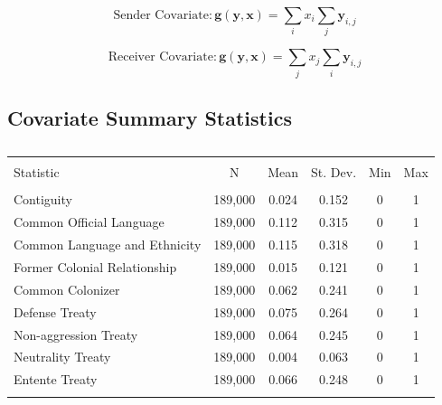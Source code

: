 \documentclass{article}
\begin{document}
$$ \text{Sender Covariate}: \bm{g(y,x)} = \sum_{i}x_i \sum_{j} \bm{y}_{i,j}$$

$$ \text{Receiver Covariate}: \bm{g(y,x)} = \sum_{j}x_j \sum_{i} \bm{y}_{i,j}$$

\subsection{Covariate Summary Statistics}

\begin{table}[!htbp] \centering 
  \caption{} 
  \label{} 
\begin{tabular}{@{\extracolsep{5pt}}lccccc} 
\\[-1.8ex]\hline 
\hline \\[-1.8ex] 
Statistic & \multicolumn{1}{c}{N} & \multicolumn{1}{c}{Mean} & \multicolumn{1}{c}{St. Dev.} & \multicolumn{1}{c}{Min} & \multicolumn{1}{c}{Max} \\ 
\hline \\[-1.8ex] 
Contiguity & 189,000 & 0.024 & 0.152 & 0 & 1 \\ 
Common Official Language & 189,000 & 0.112 & 0.315 & 0 & 1 \\ 
Common Language and Ethnicity & 189,000 & 0.115 & 0.318 & 0 & 1 \\ 
Former Colonial Relationship & 189,000 & 0.015 & 0.121 & 0 & 1 \\ 
Common Colonizer & 189,000 & 0.062 & 0.241 & 0 & 1 \\ 
Defense Treaty & 189,000 & 0.075 & 0.264 & 0 & 1 \\ 
Non-aggression Treaty & 189,000 & 0.064 & 0.245 & 0 & 1 \\ 
Neutrality Treaty & 189,000 & 0.004 & 0.063 & 0 & 1 \\ 
Entente Treaty & 189,000 & 0.066 & 0.248 & 0 & 1 \\ 
\hline \\[-1.8ex] 
\end{tabular} 
\end{table} 
\end{document}
